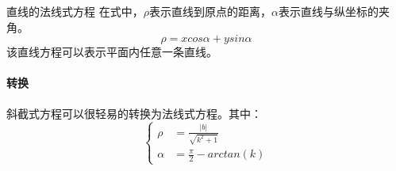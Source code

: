         \begin{theorem}{直线的法线式方程}
            在式中，$\rho$表示直线到原点的距离，$\alpha$表示直线与纵坐标的夹角。
            \begin{equation}
                \label{line_rho}
                \rho = x cos\alpha+y sin\alpha
            \end{equation}
            该直线方程可以表示平面内任意一条直线。
        \end{theorem}

        \paragraph{转换}斜截式方程可以很轻易的转换为法线式方程。其中：
        \begin{equation}
            \label{kx2ra}
            \left\{
                \begin{aligned}
                    \rho &= \frac{|b|}{\sqrt{k^2+1}} \\
                    \alpha&= \frac{\pi}{2}-arctan(k)
                \end{aligned}
            \right.
        \end{equation}


